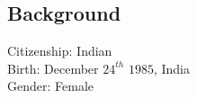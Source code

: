 \documentclass[margin,line,11pt]{res}
\begin{document}
\begin{resume}
\section{\sc Background}
Citizenship: Indian \\
Birth: December $24^{th}$ $1985$, India \\
Gender: Female


\end{resume}
\end{document}
